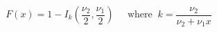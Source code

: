 

\[
F(x) = 1 - I_{k}(\frac{\nu_{2}} {2},\frac{\nu_{1}} {2} ) \;\;\;\;\; \mbox{where}\;\; k = \frac{\nu_{2}} {\nu_{2} + \nu_{1}x}
\]



